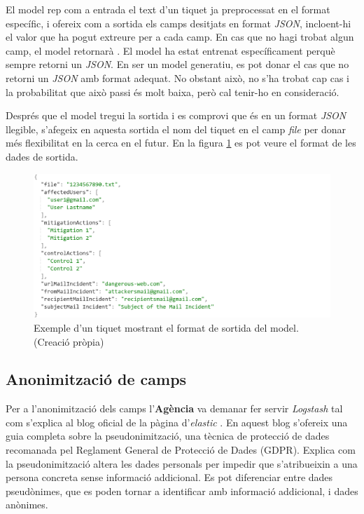 El model rep com a entrada el text d'un tiquet ja preprocessat en el format específic, i ofereix com a sortida els camps desitjats en format \textit{JSON}, incloent-hi el valor que ha pogut extreure per a cada camp. En cas que no hagi trobat algun camp, el model retornarà . El model ha estat entrenat específicament perquè sempre retorni un \textit{JSON}. En ser un model generatiu, es pot donar el cas que no retorni un \textit{JSON} amb format adequat. No obstant això, no s'ha trobat cap cas i la probabilitat que això passi és molt baixa, però cal tenir-ho en consideració. 

Després que el model tregui la sortida i es comprovi que és en un format \textit{JSON} llegible, s'afegeix en aquesta sortida el nom del tiquet en el camp \textit{file} per donar més flexibilitat en la cerca en el futur. En la figura \ref{fig:format-sortida-dades} es pot veure el format de les dades de sortida.

\begin{figure}[H]
     \centering
     \includegraphics[width=\textwidth]{format_sortida_dades.png}
     \caption[Format de sortida del model]{Exemple d'un tiquet mostrant el format de sortida del model. \\ (Creació pròpia)}
     \label{fig:format-sortida-dades}
 \end{figure}

\subsection{Anonimització de camps}
Per a l'anonimització dels camps l'\textbf{Agència} va demanar fer servir \textit{Logstash} tal com s'explica al blog oficial de la pàgina d'\textit{elastic} \cite{Logstash}. En aquest blog s'ofereix una guia completa sobre la pseudonimització, una tècnica de protecció de dades recomanada pel Reglament General de Protecció de Dades (GDPR). Explica com la pseudonimització altera les dades personals per impedir que s'atribueixin a una persona concreta sense informació addicional. Es pot diferenciar entre dades pseudònimes, que es poden tornar a identificar amb informació addicional, i dades anònimes.

